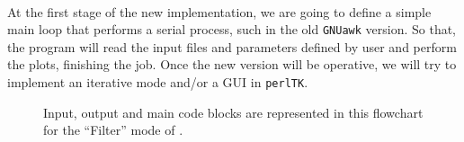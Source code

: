 \documentclass[11pt]{article}
\let\nwdocspar=\par                    %
\begin{document}

\newpage

\thispagestyle{empty}

\ %

\newpage
{}
\setcounter{page}{1}
\pagestyle{fancy}
\renewcommand{\sectionmark}[1]{\markboth{}{\textbf{\prog}\hspace{4ex}\thesection.\ #1}} 
\renewcommand{\subsectionmark}[1]{\markboth{}{\textbf{\prog}\hspace{4ex}\thesubsection.\ \textsl{#1}}}

\tableofcontents

\clearpage

\listoftables

\listoffigures


\newpage
{}
\setcounter{page}{1}


\label{todo:AAZ}
\nwenddocs{}%
%
\nwdocspar
\nwenddocs{}%
%
\nwdocspar
\todo{ \item \todoAAZ } %

\nwenddocs{}%
\nwdocspar


At the first stage of the new {\prog} implementation, we are going to define a simple main loop that performs a serial process, such in the old {\tt{}GNUawk} version. So that, the program will read the input files and parameters defined by user and perform the plots, finishing the job. Once the new version will be operative, we will try to implement an iterative mode and/or a GUI in {\tt{}perlTK}.  

\label{todo:AAA}
\nwenddocs{}%
%
\nwdocspar
\nwenddocs{}%
%
\nwdocspar
\todo{ \item \todoAAA } %

\begin{figure}[!ht]
\begin{center}
\fbox{\parbox[c][6cm][c]{\linewidth}{\hfill}}
\caption[``Filter'' mode of {\prog}.]{\label{fig:filtermode} Input, output and main code blocks are represented in this flowchart for the ``Filter'' mode of {\prog}.}
\end{center}
\end{figure}
\end{document}
